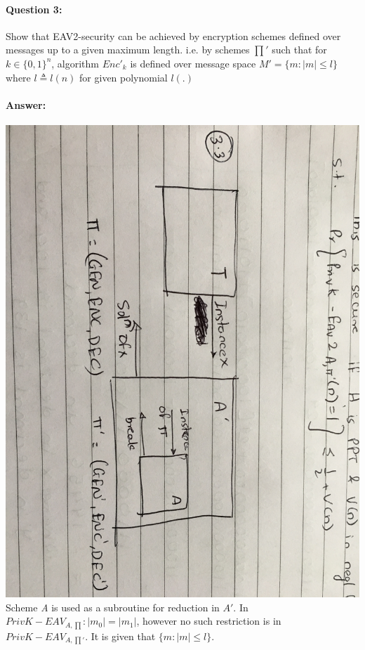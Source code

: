 \documentclass{article}
\begin{document}
    \paragraph{Question 3:} Show that EAV2-security can be achieved by encryption schemes defined over messages up to  a given maximum length. i.e. by schemes $\prod\prime$ such that for $k \in {\{0,1\}}^n$, algorithm ${Enc\prime}_k$ is defined over message space ${M\prime}={\{m:|m|\leq l\}}$ where $l\triangleq l(n)$ for given polynomial $l(.)$
    
    \paragraph{Answer: \newline}
        \includegraphics[scale=0.1]{S3Q3}
        \newline\newline
        Scheme \emph{A} is used as a subroutine for reduction in $A\prime$. In ${PrivK-EAV_{A,\prod}}: |m_0|=|m_1|$, however no such restriction is in ${PrivK-EAV_{A,\prod\prime}}$. It is given that ${\{m:|m|\leq l\}}$.
\end{document}
